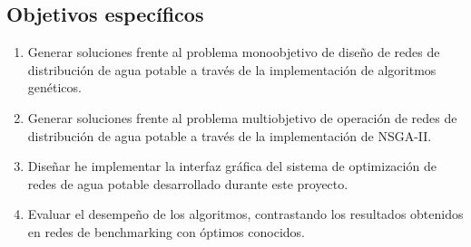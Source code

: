 \documentclass[11pt,letterpaper]{article}
\begin{document}
\subsection{Objetivos específicos}%
\begin{enumerate}
\item Generar soluciones frente al problema monoobjetivo de diseño de redes de distribución de agua potable a través de la implementación de algoritmos genéticos.
\item Generar soluciones frente al problema multiobjetivo de operación de redes de distribución de agua potable a través de la implementación de NSGA-II.
\item Diseñar he implementar la interfaz gráfica del sistema de optimización de redes de agua potable desarrollado durante este proyecto.
\item Evaluar el desempeño de los algoritmos, contrastando los resultados obtenidos en redes de benchmarking con óptimos conocidos.
\end{enumerate}
\end{document}
